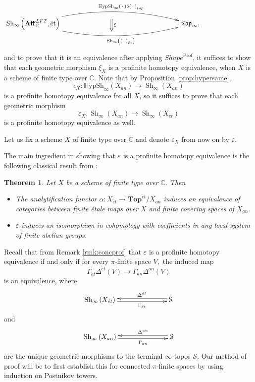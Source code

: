 \documentclass[12pt]{amsart}
\newtheorem{theorem}[dummy]{Theorem}
\theoremstyle{definition}
\newcommand{\bC}{\mathbb{C}}
\newcommand{\cS}{\mathcal{S}}
\newcommand{\Aff}{\mathbf{Aff}^{\mathit{LFT}}_{\mathbb{C}}}
\newcommand{\Sh}{\operatorname{Sh}}
\newcommand{\et}{\acute{e}t}
\def\Top{\mathbf{Top}}
\renewcommand{\i}{\infty}
\def\Shi{\Sh_\i}
\def\Hshi{\mathbb{H}\mathrm{ypSh}_\i}
\def\blank{\mspace{3mu}\cdot\mspace{3mu}}
\def\Prof{\operatorname{Prof}}
\def\Shape{\mathit{Shape}}
\def\Top{\mathbf{Top}}
\begin{document}
$$ \xygraph{!{0;(6.5,0):(0,0.15)::}
{\Shi\left(\Aff,\mbox{\'et}\right)}="a" [r] {\mathfrak{Top}_\i,}="b"
"a":@/^{1.5pc}/"b"^-{\Hshi\left(\blank\right)\circ \left(\blank\right)_{top}}|(.4){}="l"
"a":@/_{1.5pc}/"b"_-{\Shi\left(\left(\blank\right)_{\et}\right)}
"l" [d(.3)]  [r(0.1)] :@{=>}^{\xi} [d(.5)]} $$
and to prove that it is an equivalence after applying $\Shape^{\Prof}$, it suffices to show that each geometric morphism $\xi_X$ is a profinite homotopy equivalence, when $X$ is a scheme of finite type over $\bC$. Note that by Proposition \ref{prop:hypersame},
$$\epsilon_X:\Hshi\left(X_{an}\right) \to \Shi\left(X_{an}\right)$$ is a profinite homotopy equivalence for all $X$, so it suffices to prove that each geometric morphism $$\varepsilon_X:\Shi\left(X_{an}\right) \to \Shi\left(X_{\et}\right)$$ is a profinite homotopy equivalence as well.

Let us fix a scheme $X$ of finite type over $\bC$ and denote $\varepsilon_X$ from now on by $\varepsilon.$

The main ingredient in showing that $\varepsilon$ is a profinite homotopy equivalence is the following classical result from \cite{SGA4}:

\begin{theorem}\cite[expos\'e XI.4 Theorem 4.3, Theorem 4.4, and expos\'e XVI.4, Theorem 4.1]{SGA4}\label{thm:SGA}
Let $X$ be a scheme of finite type over $\bC.$ Then
\begin{itemize}
\item[1)] The analytification functor $\alpha:X_{\et} \to \Top^{\et}/X_{an}$ induces an equivalence of categories between finite \'etale maps over $X$  and finite covering spaces of $X_{an}.$
\item[2)] $\varepsilon$ induces an isomorphism in cohomology with coefficients in any local system of finite abelian groups.
\end{itemize}
\end{theorem}

Recall that from Remark \ref{rmk:concprof} that $\varepsilon$ is a profinite homotopy equivalence if and only if for every $\pi$-finite space $V,$ the induced map 
$$\Gamma_{\et}\Delta^{\et}\left(V\right) \to \Gamma_{an}\Delta^{an}\left(V\right)$$ is an equivalence, where
$$\xymatrix@C=2.5cm{\Shi\left(X_{\et}\right) \ar@<-0.5ex>[r]_-{\Gamma_{\et}} & \cS \ar@<-0.5ex>[l]_-{\Delta^{\et}}}$$
and
$$\xymatrix@C=2.5cm{\Shi\left(X_{an}\right) \ar@<-0.5ex>[r]_-{\Gamma_{an}} & \cS \ar@<-0.5ex>[l]_-{\Delta^{an}}}$$
are the unique geometric morphisms to the terminal $\i$-topos $\cS.$
Our method of proof will be to first establish this for connected $\pi$-finite spaces by using induction on Postnikov towers.
\end{document}
